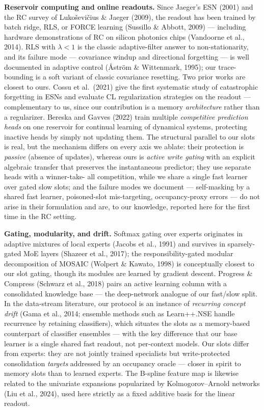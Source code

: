 \documentclass[11pt]{article}
\begin{document}
\textbf{Reservoir computing and online readouts.} Since Jaeger's ESN
(2001) and the RC survey of Lukoševičius \& Jaeger (2009), the readout
has been trained by batch ridge, RLS, or FORCE learning (Sussillo \&
Abbott, 2009) --- including hardware demonstrations of RC on silicon
photonics chips (Vandoorne et al., 2014).
RLS with \(\lambda<1\) is the classic adaptive-filter answer to
non-stationarity, and its failure mode --- covariance windup and
directional forgetting --- is well documented in adaptive control
(Åström \& Wittenmark, 1995); our trace-bounding is a soft variant of
classic covariance resetting. Two prior works are closest to ours.
Cossu et al.~(2021) give the first systematic study of catastrophic
forgetting in ESNs and evaluate CL regularization strategies on the
readout --- complementary to us, since our contribution is a memory
\emph{architecture} rather than a regularizer. Bereska and Gavves (2022) train
multiple \emph{competitive prediction heads} on one reservoir for
continual learning of dynamical systems, protecting inactive heads
by simply not updating them. The structural parallel to our slots is
real, but the mechanism differs on every axis we ablate: their
protection is \emph{passive} (absence of updates), whereas ours is \emph{active
write gating} with an explicit algebraic transfer that preserves the
instantaneous predictor; they use separate heads with a winner-take-
all competition, while we share a single fast learner over gated slow
slots; and the failure modes we document --- self-masking by a shared
fast learner, poisoned-slot mis-targeting, occupancy-proxy errors ---
do not arise in their formulation and are, to our knowledge, reported
here for the first time in the RC setting.

\textbf{Gating, modularity, and drift.} Softmax gating over experts
originates in adaptive mixtures of local experts (Jacobs et al., 1991)
and survives in sparsely-gated MoE layers (Shazeer et al., 2017); the
responsibility-gated modular decomposition of MOSAIC (Wolpert \&
Kawato, 1998) is conceptually closest to our slot gating, though its
modules are learned by gradient descent. Progress \& Compress (Schwarz
et al., 2018) pairs an active learning column with a consolidated
knowledge base --- the deep-network analogue of our fast/slow split. In
the data-stream literature, our protocol is an instance of \emph{recurring
concept drift} (Gama et al., 2014; ensemble methods such as Learn++.NSE
handle recurrence by retaining classifiers), which situates the slots as
a memory-based counterpart of classifier ensembles --- with the key
difference that our base learner is a single shared fast readout, not
per-context models. Our slots differ
from experts: they are not jointly trained specialists but
write-protected consolidation \emph{targets} addressed by an occupancy
oracle --- closer in spirit to memory slots than to learned experts.
The B-spline feature map is likewise related to the univariate
expansions popularized by Kolmogorov--Arnold networks (Liu et al.,
2024), used here strictly as a fixed additive basis for the linear
readout.
\end{document}
